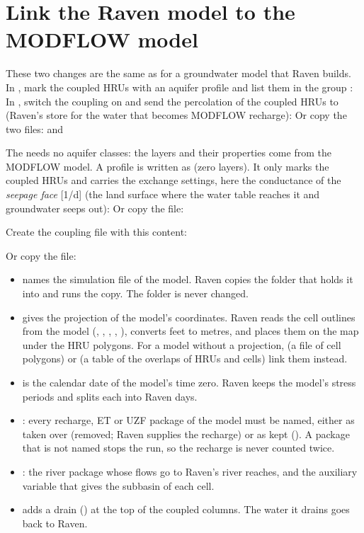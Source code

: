 \section{Link the Raven model to the MODFLOW model}

These two changes are the same as for a groundwater model that Raven builds. In , mark the coupled HRUs
with an aquifer profile and list them in the group :
In , switch the coupling on and send the percolation of the coupled HRUs to  (Raven's store
for the water that becomes MODFLOW recharge):
Or copy the two files:  and 

The  needs no aquifer classes: the layers and their properties come from the MODFLOW model. A profile is written
as  (zero layers). It only marks the coupled HRUs and carries the exchange settings, here the conductance of
the \emph{seepage face} [1/d] (the land surface where the water table reaches it and groundwater seeps out):
Or copy the file: 

\label{st:rvg}
Create the coupling file  with this content:

Or copy the file: 
\why
\begin{itemize}
\item {} names the simulation file of the model. Raven copies the folder that holds it into
   and runs the copy. The folder  is never changed.
\item {} gives the projection of the model's coordinates. Raven reads the cell outlines from the model
  (, , , , ), converts feet to metres, and places them on the
  map under the HRU polygons. For a model without a projection,  (a file of cell polygons) or
   (a table of the overlaps of HRUs and cells) link them instead.
\item {} is the calendar date of the model's time zero. Raven keeps the model's stress periods and splits
  each into Raven days.
\item {}: every recharge, ET or UZF package of the model must be named, either as
  taken over (removed; Raven supplies the recharge) or as kept (). A package that is not named stops
  the run, so the recharge is never counted twice.
\item {}: the river package whose flows go to Raven's river reaches, and the
  auxiliary variable that gives the subbasin of each cell.
\item {} adds a drain () at the top of the coupled columns. The water it drains goes
  back to Raven.
\end{itemize}
